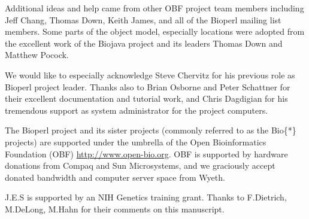 \documentclass[12pt]{article}
\begin{document}
Additional ideas and help came from other OBF project team members
including Jeff Chang, Thomas Down, Keith James, and all of the Bioperl
mailing list members.  Some parts of the object model, especially
locations were adopted from the excellent work of the Biojava project
and its leaders Thomas Down and Matthew Pocock.

We would like to especially acknowledge Steve Chervitz for his
previous role as Bioperl project leader.  Thanks also to Brian Osborne
and Peter Schattner for their excellent documentation and tutorial
work, and Chris Dagdigian for his tremendous support as system
administrator for the project computers.

The Bioperl project and its sister projects (commonly referred to as
the Bio\{*\} projects) are supported under the umbrella of the Open
Bioinformatics Foundation (OBF) \url{http://www.open-bio.org}.
OBF is supported by hardware donations from Compaq and Sun
Microsystems, and we graciously accept donated bandwidth and computer
server space from Wyeth.

J.E.S is supported by an NIH Genetics training grant.  Thanks to
F.Dietrich, M.DeLong, M.Hahn for their comments on this manuscript.


 

\newpage
\end{document}
